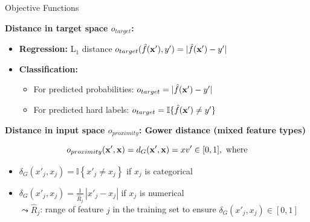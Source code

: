 \documentclass[10pt,compress,t,notes=noshow, xcolor=table]{beamer}
\begin{document}
\begin{frame}{Objective Functions }

\textbf{Distance in target space $o_{target}$:}

\begin{itemize}
  \item \textbf{Regression:} L$_1$ distance   
  $o_{target}(\hat{f}(\mathbf{x}'), y') = | \hat{f}(\mathbf{x}') - y'|$
  
  \item \textbf{Classification:}  
  \begin{itemize}
    \item For predicted probabilities: $o_{target} = | \hat{f}(\mathbf{x}') - y'|$
    \item For predicted hard labels: $o_{target} = \mathbb{I} \{ \hat{f}(\mathbf{x}') \ne y'\}$
  \end{itemize}
\end{itemize}

\pause

\textbf{Distance in input space $o_{proximity}$: Gower distance (mixed feature types)}

\[
o_{proximity}(\mathbf{x}', \mathbf{x}) = d_G(\mathbf{x}', \mathbf{x}) = xv' \in [0, 1], \text{ where}
\]


\begin{itemize}
  \item $\delta_G(x'_j, x_j) = \mathbb{I} \left\{ x'_j \ne x_j \right\}$ if $x_j$ is categorical
  \item $\delta_G(x'_j, x_j) = \frac{1}{\widehat{R}_j} \, |x'_j - x_j| $ if $x_j$ is numerical\\
  $\leadsto \widehat{R}_j$: range of feature $j$ in the training set to ensure $\delta_G(x'_j, x_j) \in [0, 1]$
\end{itemize}

\end{frame}


	
\end{document}
